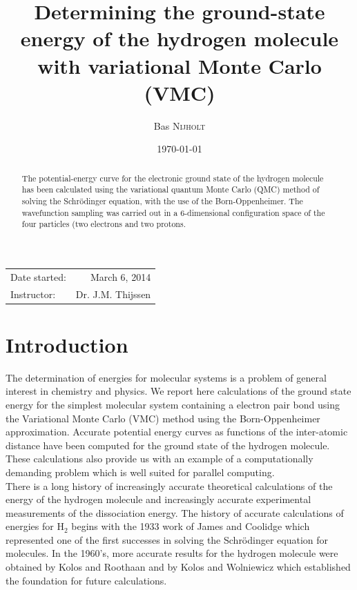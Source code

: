 \documentclass{article}
\title{Determining the ground-state energy of the hydrogen molecule with variational Monte Carlo (VMC)} %
\author{Bas \textsc{Nijholt}} %
\date{\today} %
\begin{document}
\maketitle %

\begin{center}
\begin{tabular}{l r}
Date started: & March 6, 2014 \\ 
Instructor: & Dr. J.M. Thijssen
\end{tabular}
\end{center}

\begin{abstract}
The potential-energy curve for the electronic ground state of the hydrogen molecule has been calculated using the variational quantum Monte Carlo (QMC) method of solving the Schr\"odinger equation, with the use of the Born-Oppenheimer. The wavefunction sampling was carried out in a 6-dimensional configuration space of the four particles (two electrons and two protons.
\end{abstract}


\section{Introduction}
The determination of energies for molecular systems is a problem of general interest in chemistry and physics. We report here calculations of the ground state energy for the simplest molecular system containing a electron pair bond using the Variational Monte Carlo (VMC) method using the Born-Oppenheimer approximation. Accurate potential energy curves as functions of the inter-atomic distance have been computed for the ground state of the hydrogen molecule. \\

These calculations also provide us with an example of a computationally demanding problem which is well suited for parallel computing.\\ 

There is a long history of increasingly accurate theoretical calculations of the energy of the hydrogen molecule and increasingly accurate experimental measurements of the dissociation energy. The history of accurate calculations of energies for H$_2$ begins with the 1933 work of James and Coolidge \citep{james1933ground} which represented one of the first successes in solving the Schr\"odinger equation for molecules. In the 1960's, more accurate results for the hydrogen molecule were obtained by Kolos and Roothaan \citep{kolos1960accurate} and by Kolos and Wolniewicz \citep{kolos1963nonadiabatic, kol1964accurate, kol1965potential, kolos1968improved} which established the foundation for future calculations. \\
\end{document}

